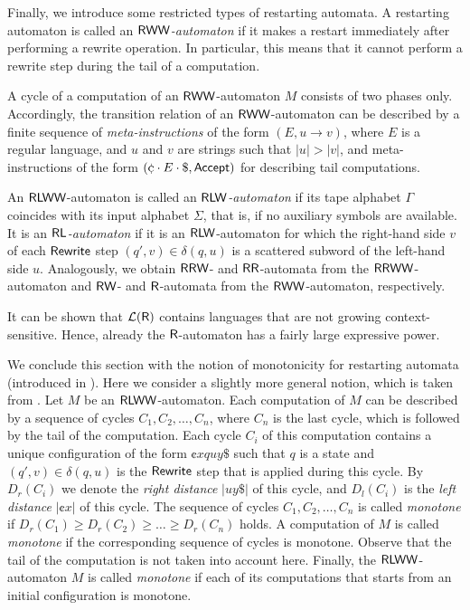 Finally, we introduce some restricted types of restarting automata. A restarting automaton is called an \emph{$\textup{\sf RWW}$-automaton} if it makes a restart immediately after performing a rewrite operation. In particular, this means that it cannot perform a rewrite step during the tail of a computation.

A cycle of a computation of an $\textup{\sf RWW}$-automaton $M$ consists of two phases only. Accordingly, the transition relation of an $\textup{\sf RWW}$-automaton can be described by a finite sequence of \emph{meta-instructions} of the form $(E, u \to v)$, where $E$ is a regular language, and $u$ and $v$ are strings such that $|u| > |v|$, and meta-instructions of the form $(\cent \cdot E \cdot \$, \Accept)$ for describing tail computations.

An $\textup{\sf RLWW}$-automaton is called an \emph{$\textup{\sf RLW}$-automaton} if its tape alphabet $\Gamma$ coincides with its input alphabet $\Sigma$, that is, if no auxiliary symbols are available. It is an \emph{$\textup{\sf RL}$-automaton} if it is an $\textup{\sf RLW}$-automaton for which the right-hand side $v$ of each $\textup{\sf Rewrite}$ step $(q', v) \in \delta(q, u)$ is a scattered subword of the left-hand side $u$. Analogously, we obtain $\textup{\sf RRW}$- and $\textup{\sf RR}$-automata from the $\textup{\sf RRWW}$-automaton and $\textup{\sf RW}$- and $\textup{\sf R}$-automata from the $\textup{\sf RWW}$-automaton, respectively.

It can be shown that ${\cal L}(\textup{\sf R})$ contains languages that are not growing context-sensitive. Hence, already the $\textup{\sf R}$-automaton has a fairly large expressive power.

We conclude this section with the notion of monotonicity for restarting automata (introduced in \citep{JMPV97}). Here we consider a slightly more general notion, which is taken from \citep{JMPV07}. Let $M$ be an  $\textup{\sf RLWW}$-automaton. Each computation of $M$ can be described by a sequence of cycles $C_1, C_2, \ldots, C_n$, where $C_n$ is the last cycle, which is followed by the tail of the computation. Each cycle $C_i$ of this computation contains a unique configuration of the form $\cent x q u y \$$ such that $q$ is a state and $(q', v) \in \delta(q, u)$ is the $\textup{\sf Rewrite}$ step that is applied during this cycle. By $D_r(C_i)$ we denote the \emph{right distance} $|u y \$|$ of this cycle, and $D_l(C_i)$ is the \emph{left distance} $|\cent x|$ of this cycle. The sequence of cycles $C_1, C_2, \ldots, C_n$ is called \emph{monotone} if $D_r(C_1) \ge D_r(C_2) \ge \ldots \ge D_r(C_n)$ holds. A computation of $M$ is called \emph{monotone} if the corresponding sequence of cycles is monotone. Observe that the tail of the computation is not taken into account here. Finally, the $\textup{\sf RLWW}$-automaton $M$ is called \emph{monotone} if each of its computations that starts from an initial configuration is monotone.

